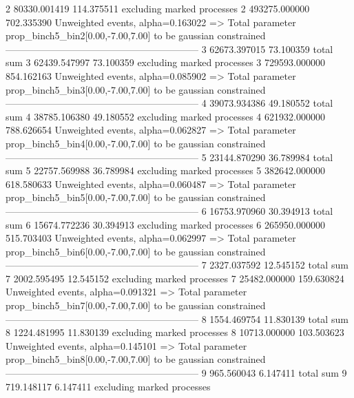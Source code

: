 2          80330.001419    114.375511      excluding marked processes    
2          493275.000000   702.335390      Unweighted events, alpha=0.163022
  => Total parameter prop_binch5_bin2[0.00,-7.00,7.00] to be gaussian constrained
------------------------------------------------------------
3          62673.397015    73.100359       total sum                     
3          62439.547997    73.100359       excluding marked processes    
3          729593.000000   854.162163      Unweighted events, alpha=0.085902
  => Total parameter prop_binch5_bin3[0.00,-7.00,7.00] to be gaussian constrained
------------------------------------------------------------
4          39073.934386    49.180552       total sum                     
4          38785.106380    49.180552       excluding marked processes    
4          621932.000000   788.626654      Unweighted events, alpha=0.062827
  => Total parameter prop_binch5_bin4[0.00,-7.00,7.00] to be gaussian constrained
------------------------------------------------------------
5          23144.870290    36.789984       total sum                     
5          22757.569988    36.789984       excluding marked processes    
5          382642.000000   618.580633      Unweighted events, alpha=0.060487
  => Total parameter prop_binch5_bin5[0.00,-7.00,7.00] to be gaussian constrained
------------------------------------------------------------
6          16753.970960    30.394913       total sum                     
6          15674.772236    30.394913       excluding marked processes    
6          265950.000000   515.703403      Unweighted events, alpha=0.062997
  => Total parameter prop_binch5_bin6[0.00,-7.00,7.00] to be gaussian constrained
------------------------------------------------------------
7          2327.037592     12.545152       total sum                     
7          2002.595495     12.545152       excluding marked processes    
7          25482.000000    159.630824      Unweighted events, alpha=0.091321
  => Total parameter prop_binch5_bin7[0.00,-7.00,7.00] to be gaussian constrained
------------------------------------------------------------
8          1554.469754     11.830139       total sum                     
8          1224.481995     11.830139       excluding marked processes    
8          10713.000000    103.503623      Unweighted events, alpha=0.145101
  => Total parameter prop_binch5_bin8[0.00,-7.00,7.00] to be gaussian constrained
------------------------------------------------------------
9          965.560043      6.147411        total sum                     
9          719.148117      6.147411        excluding marked processes    
